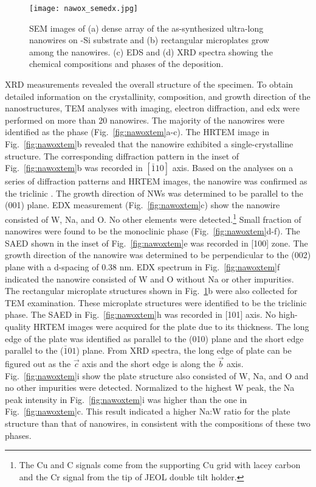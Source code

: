 \begin{figure}[htb]
\centering
\texttt{[image: nawox\_semedx.jpg]}
\caption[SEM, EDX and XRD on sodium tungsten oxides sample]{SEM images of (a) dense array of the as-synthesized ultra-long nanowires on -Si substrate and (b) rectangular microplates grow among the nanowires. (c) EDS and (d) XRD spectra showing the chemical compositions and phases of the deposition.}
\label{fig:nawoxsemedx}
\end{figure}

XRD measurements revealed the overall structure of the specimen. To obtain detailed information on the crystallinity, composition, and growth direction of the nanostructures, TEM analyses with imaging, electron diffraction, and \gls{edx} were performed on more than 20 nanowires. The majority of the nanowires were identified as the  phase (Fig.~\ref{fig:nawoxtem}a-c). The HRTEM image in Fig.~\ref{fig:nawoxtem}b revealed that the nanowire exhibited a single-crystalline structure. The corresponding diffraction pattern in the inset of Fig.~\ref{fig:nawoxtem}b was recorded in $[\bar{1}10]$ axis. Based on the analyses on a series of diffraction patterns and HRTEM images, the nanowire was confirmed as the triclinic . The growth direction of  NWs was determined to be parallel to the (001) plane. EDX measurement (Fig.~\ref{fig:nawoxtem}c) show the nanowire consisted of W, Na, and O. No other elements were detected.\footnote{The Cu and C signals come from the supporting Cu grid with lacey carbon and the Cr signal from the tip of JEOL double tilt holder.} Small fraction of nanowires were found to be the monoclinic  phase (Fig.~\ref{fig:nawoxtem}d-f). The SAED shown in the inset of Fig.~\ref{fig:nawoxtem}e was recorded in [100] zone. The growth direction of the  nanowire was determined to be perpendicular to the (002) plane with a d-spacing of 0.38 nm. EDX spectrum in Fig.~\ref{fig:nawoxtem}f indicated the nanowire consisted of W and O without Na or other impurities. The rectangular microplate structures shown in Fig.~\ref{fig:nawoxsemedx}b were also collected for TEM examination. These microplate structures were identified to be the triclinic  phase. The SAED in Fig.~\ref{fig:nawoxtem}h was recorded in [101] axis. No high-quality HRTEM images were acquired for the  plate due to its thickness. The long edge of the plate was identified as parallel to the (010) plane and the short edge parallel to the ($\bar{1}01$) plane. From XRD spectra, the long edge of  plate can be figured out as the $\vec{c}$ axis and the short edge is along the $\vec{b}$ axis. Fig.~\ref{fig:nawoxtem}i show the plate structure also consisted of W, Na, and O and no other impurities were detected. Normalized to the highest W peak, the Na peak intensity in Fig.~\ref{fig:nawoxtem}i was higher than the one in Fig.~\ref{fig:nawoxtem}c. This result indicated a higher Na:W ratio for the  plate structure than that of  nanowires, in consistent with the compositions of these two phases.
